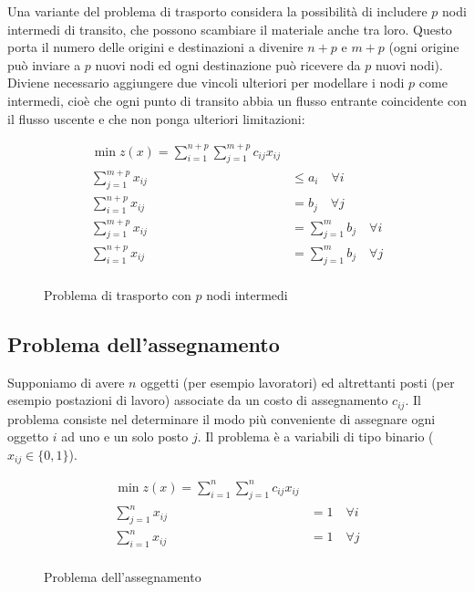 \documentclass[\main/main.tex]{subfiles}
\begin{document}
Una variante del problema di trasporto considera la possibilità di includere $p$ nodi intermedi di transito, che possono scambiare il materiale anche tra loro. Questo porta il numero delle origini e destinazioni a divenire $n+p$ e $m+p$ (ogni origine può inviare a $p$ nuovi nodi ed ogni destinazione può ricevere da $p$ nuovi nodi). Diviene necessario aggiungere due vincoli ulteriori per modellare i nodi $p$ come intermedi, cioè che ogni punto di transito abbia un flusso entrante coincidente con il flusso uscente e che non ponga ulteriori limitazioni:


\begin{figure}
	\begin{align*}
		\min z(x) = \sum_{i=1}^{n+p}\sum_{j=1}^{m+p} c_{ij}x_{ij}       \\
		\sum_{j=1}^{m+p} x_{ij} & \leq a_i \quad \forall i              \\
		\sum_{i=1}^{n+p} x_{ij} & = b_j    \quad \forall j              \\
		\sum_{j=1}^{m+p} x_{ij} & = \sum_{j=1}^m b_j    \quad \forall i \\
		\sum_{i=1}^{n+p} x_{ij} & = \sum_{j=1}^m b_j    \quad \forall j \\
	\end{align*}
	\caption{Problema di trasporto con $p$ nodi intermedi}
\end{figure}

\subsection{Problema dell'assegnamento}
Supponiamo di avere $n$ oggetti (per esempio lavoratori) ed altrettanti posti (per esempio postazioni di lavoro) associate da un costo di assegnamento $c_{ij}$. Il problema consiste nel determinare il modo più conveniente di assegnare ogni oggetto $i$ ad uno e un solo posto $j$. Il problema è a variabili di tipo binario ($x_{ij} \in \{0,1\}$).

\begin{figure}
	\begin{align*}
		\min z(x) = \sum_{i=1}^n\sum_{j=1}^n c_{ij}x_{ij} \\
		\sum_{j=1}^n x_{ij} & = 1 \quad \forall i         \\
		\sum_{i=1}^n x_{ij} & = 1  \quad \forall j        \\
	\end{align*}
	\caption{Problema dell'assegnamento}
\end{figure}
\end{document}
